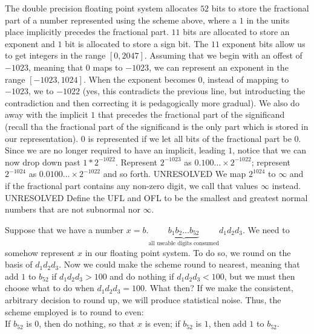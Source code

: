 \documentclass[../main.tex]{subfiles}
\begin{document}
\begin{definition}

    \begin{outline}
        \1 The double precision floating point system allocates $52$ bits to store the fractional part of a number represented using the scheme above, where a $1$ in the units place implicitly precedes the fractional part.
        \1 $11$ bits are allocated to store an exponent and $1$ bit is allocated to store a sign bit.
        \2 The $11$ exponent bits allow us to get integers in the range $[0,2047]$. Assuming that we begin with an offest of $-1023$,
        meaning that $0$ maps to $-1023$, we can represent an exponent in the range $[-1023, 1024]$.
        \1 When the exponent becomes $0$, instead of mapping to $-1023$, we to $-1022$ (yes, this contradicts the previous line, but
        introducting the contradiction and then correcting it is pedagogically more gradual). We also do away with the implicit $1$ that precedes
        the fractional part of the significand (recall tha the fractional part of the significand is the only part which is stored in our representation). $0$ is represented if we let all bits of the fractional part be $0$.
        \2 Since we are no longer required to have an implicit, leading $1$, notice that we can now drop down past $1 * 2^{-1022}$. Represent
        $2^{-1023}$ as $0.100\dots \times 2^{-1022}$; represent $2^{-1024}$ as $0.0100\dots \times 2^{-1022}$ and so forth. UNRESOLVED
        \1 We map $2^{1024}$ to $\infty$ and if the fractional part contains any non-zero digit, we call that values $\infty$ instead. UNRESOLVED
        \1 Define the UFL and OFL to be the smallest and greatest normal numbers that are not subnormal nor $\infty$.
    \end{outline}
\end{definition}

\begin{definition}
    Suppose that we have a number $x = b.\underbrace{b_1b_2\dots b_{52}}_{\text{all useable digits consumed}}d_1d_2d_3$. We need to somehow represent
    $x$ in our floating point system. To do so, we round on the basis of $d_1d_2d_3$. Now we could make the scheme round to nearest, meaning that
    add $1$ to $b_{52}$ if $d_1d_2d_3 > 100$ and do nothing if $d_1d_2d_3 < 100$, but we must then choose what to do when $d_1d_2d_3 = 100$. What
    then? If we make the consistent, arbitrary decision to round up, we will produce statistical noise. Thus, the scheme employed is to round to even: \\

    If $b_{52}$ is 0, then do nothing, so that $x$ is even; if $b_{52}$ is $1$, then add $1$ to $b_{52}$.
\end{definition}
\end{document}
